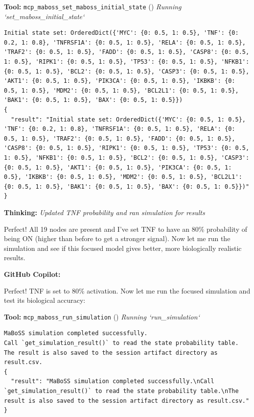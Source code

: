 \documentclass[11pt,a4paper]{article}
\begin{document}
\begin{toolokbox}
\textbf{Tool:} \texttt{mcp\_maboss\_set\_maboss\_initial\_state} (\checkmark)
\textit{Running `set\_maboss\_initial\_state`}
\begin{lstlisting}
Initial state set: OrderedDict({'MYC': {0: 0.5, 1: 0.5}, 'TNF': {0: 0.2, 1: 0.8}, 'TNFRSF1A': {0: 0.5, 1: 0.5}, 'RELA': {0: 0.5, 1: 0.5}, 'TRAF2': {0: 0.5, 1: 0.5}, 'FADD': {0: 0.5, 1: 0.5}, 'CASP8': {0: 0.5, 1: 0.5}, 'RIPK1': {0: 0.5, 1: 0.5}, 'TP53': {0: 0.5, 1: 0.5}, 'NFKB1': {0: 0.5, 1: 0.5}, 'BCL2': {0: 0.5, 1: 0.5}, 'CASP3': {0: 0.5, 1: 0.5}, 'AKT1': {0: 0.5, 1: 0.5}, 'PIK3CA': {0: 0.5, 1: 0.5}, 'IKBKB': {0: 0.5, 1: 0.5}, 'MDM2': {0: 0.5, 1: 0.5}, 'BCL2L1': {0: 0.5, 1: 0.5}, 'BAK1': {0: 0.5, 1: 0.5}, 'BAX': {0: 0.5, 1: 0.5}})
{
  "result": "Initial state set: OrderedDict({'MYC': {0: 0.5, 1: 0.5}, 'TNF': {0: 0.2, 1: 0.8}, 'TNFRSF1A': {0: 0.5, 1: 0.5}, 'RELA': {0: 0.5, 1: 0.5}, 'TRAF2': {0: 0.5, 1: 0.5}, 'FADD': {0: 0.5, 1: 0.5}, 'CASP8': {0: 0.5, 1: 0.5}, 'RIPK1': {0: 0.5, 1: 0.5}, 'TP53': {0: 0.5, 1: 0.5}, 'NFKB1': {0: 0.5, 1: 0.5}, 'BCL2': {0: 0.5, 1: 0.5}, 'CASP3': {0: 0.5, 1: 0.5}, 'AKT1': {0: 0.5, 1: 0.5}, 'PIK3CA': {0: 0.5, 1: 0.5}, 'IKBKB': {0: 0.5, 1: 0.5}, 'MDM2': {0: 0.5, 1: 0.5}, 'BCL2L1': {0: 0.5, 1: 0.5}, 'BAK1': {0: 0.5, 1: 0.5}, 'BAX': {0: 0.5, 1: 0.5}})"
}
\end{lstlisting}
\end{toolokbox}
\begin{thinkbox}
\textbf{Thinking:} \textit{Updated TNF probability and ran simulation for results}

Perfect! All 19 nodes are present and I've set TNF to have an 80\% probability of being ON (higher than before to get a stronger signal). Now let me run the simulation and see if this focused model gives better, more biologically realistic results.

\end{thinkbox}
\begin{copilotbox}
\textbf{GitHub Copilot:}

Perfect! TNF is set to 80\% activation. Now let me run the focused simulation and test its biological accuracy:

\end{copilotbox}
\begin{toolokbox}
\textbf{Tool:} \texttt{mcp\_maboss\_run\_simulation} (\checkmark)
\textit{Running `run\_simulation`}
\begin{lstlisting}
MaBoSS simulation completed successfully.
Call `get_simulation_result()` to read the state probability table.
The result is also saved to the session artifact directory as result.csv.
{
  "result": "MaBoSS simulation completed successfully.\nCall `get_simulation_result()` to read the state probability table.\nThe result is also saved to the session artifact directory as result.csv."
}
\end{lstlisting}
\end{toolokbox}
\end{document}

